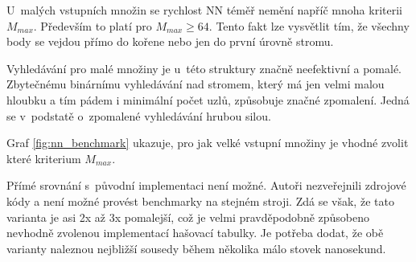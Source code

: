 U~malých vstupních množin se rychlost NN téměř nemění napříč mnoha kriterii $M_{max}$. Především to platí pro $M_{max} \geq 64$. Tento fakt lze vysvětlit tím, že všechny body se vejdou přímo do kořene nebo jen do první úrovně stromu. 

Vyhledávání pro malé množiny je u~této struktury značně neefektivní a pomalé. Zbytečnému binárnímu vyhledávání nad stromem, který má jen velmi malou hloubku a tím pádem i minimální počet uzlů, způsobuje značné zpomalení. Jedná se v~podstatě o~zpomalené vyhledávání hrubou silou. 

Graf \ref{fig:nn_benchmark} ukazuje, pro jak velké vstupní množiny je vhodné zvolit které kriterium $M_{max}$.

Přímé srovnání s~původní implementaci není možné. Autoři nezveřejnili zdrojové kódy a není možné provést benchmarky na stejném stroji. Zdá se však, že tato varianta je  asi 2x až 3x pomalejší, což je velmi pravděpodobně způsobeno nevhodně zvolenou implementací hašovací tabulky. Je potřeba dodat, že obě varianty naleznou nejbližší sousedy během několika málo stovek nanosekund.


